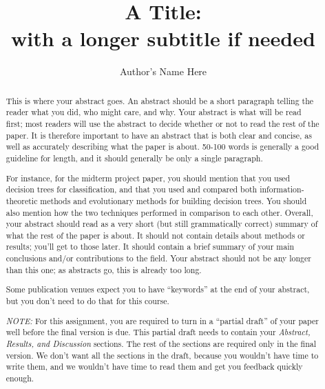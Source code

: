 \documentclass[12pt, letterpaper]{article}
\title{A Title: \\ with a longer subtitle if needed}
\author{Author's Name Here}
\begin{document}
\maketitle

\begin{abstract}
This is where your abstract goes.  An abstract should be a short paragraph
telling the reader what you did, who might care, and why.  Your abstract is what
will be read first; most readers will use the abstract to decide whether or not
to read the rest of the paper.  It is therefore important to have an abstract
that is both clear and concise, as well as accurately describing what the paper
is about.  50-100 words is generally a good guideline for length, and it should
generally be only a single paragraph.

For instance, for the midterm project paper, you should mention that you used
decision trees for classification, and that you used and compared both
information-theoretic methods and evolutionary methods for building
decision trees.  You should also mention how the two techniques performed in
comparison to each other.  Overall, your abstract should read as a very short
(but still grammatically correct) summary of what the rest of the paper is
about.  It should not contain details about methods or results; you'll get to
those later.  It should contain a brief summary of your main conclusions and/or
contributions to the field. Your abstract should not be any longer than this
one; as abstracts go, this is already too long.

Some publication venues expect you to have ``keywords'' at the end of your
abstract, but you don't need to do that for this course.

\emph{NOTE:} For this assignment, you are required to turn in a ``partial
draft'' of your paper well before the final version is due.  This partial 
draft needs to contain your \emph{Abstract, Results, and Discussion} sections.
The rest of the sections are required only in the final version.  We don't want
all the sections in the draft, because you wouldn't have time to write them, and
we wouldn't have time to read them and get you feedback quickly enough.
\end{abstract}
\end{document}
